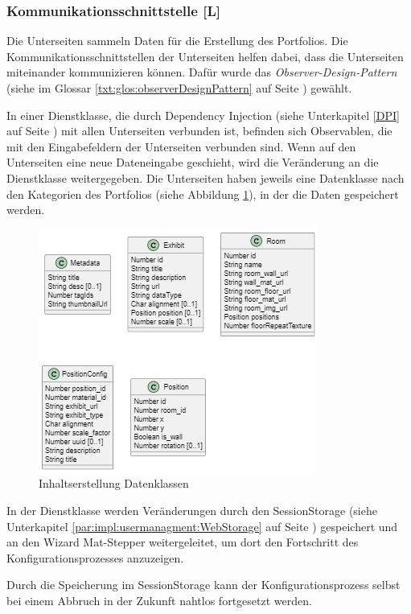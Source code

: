 \subsubsection{Kommunikationsschnittstelle [L]}
Die Unterseiten sammeln Daten für die Erstellung des Portfolios. Die Kommunikationsschnittstellen der Unterseiten helfen dabei, dass die Unterseiten miteinander kommunizieren können. Dafür wurde das \emph{Observer-Design-Pattern} (siehe im Glossar \ref{txt:glos:observerDesignPattern} auf Seite \pageref{txt:glos:observerDesignPattern}) gewählt.

In einer Dienstklasse, die durch Dependency Injection (siehe Unterkapitel \ref{DPI} auf Seite \pageref{DPI}) mit allen Unterseiten verbunden ist, befinden sich Observablen, die mit den Eingabefeldern der Unterseiten verbunden sind. Wenn auf den Unterseiten eine neue Dateneingabe geschieht, wird die Veränderung an die Dienstklasse weitergegeben. Die Unterseiten haben jeweils eine Datenklasse nach den Kategorien des Portfolios (siehe Abbildung \ref{fig:impl:creation:dataclasses}), in der die Daten gespeichert werden.

\begin{figure}
    \centering
    \includegraphics[scale=0.7]{pics/content_creation_classes.png}
    \caption{Inhaltserstellung Datenklassen}
    \label{fig:impl:creation:dataclasses}
\end{figure}

In der Dienstklasse werden Veränderungen durch den SessionStorage (siehe Unterkapitel \ref{par:impl:usermanagment:WebStorage} auf Seite \pageref{par:impl:usermanagment:WebStorage}) gespeichert und an den Wizard Mat-Stepper weitergeleitet, um dort den Fortschritt des Konfigurationsprozesses anzuzeigen.

Durch die Speicherung im SessionStorage kann der Konfigurationsprozess selbst bei einem Abbruch in der Zukunft nahtlos fortgesetzt werden.

